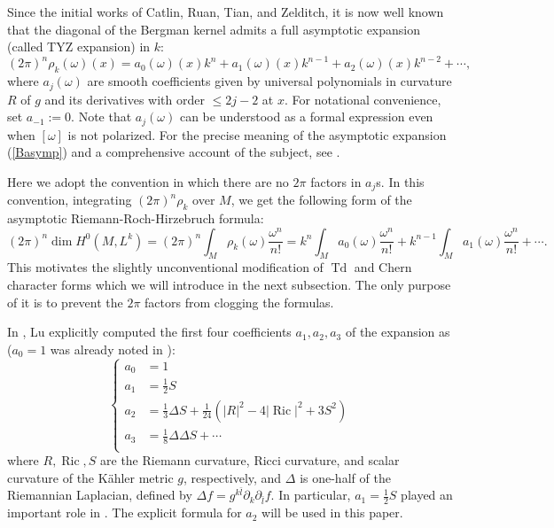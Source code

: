 \documentclass[12pt,reqno,a4paper]{amsart}
\numberwithin{equation}{section}
\def\bl{\bar l}
\def\p{\partial}
\DeclareMathOperator{\Td}{Td}
\DeclareMathOperator{\ric}{Ric}
\theoremstyle{remark}
\theoremstyle{dotless}
\begin{document}
Since the initial works of Catlin, Ruan, Tian, and Zelditch, it is now well known that the diagonal of the Bergman kernel admits a full asymptotic expansion (called TYZ expansion) in $k$:
\begin{equation}\label{Basymp}
(2\pi)^n\rho_k(\omega)(x)=a_0(\omega)(x)k^n+a_1(\omega)(x)k^{n-1}+a_2(\omega)(x)k^{n-2}+\cdots,
\end{equation}
where $a_j(\omega)$ are smooth coefficients given by universal polynomials in curvature $R$ of $g$ and its derivatives with order $\leq 2j-2$ at $x$. For notational convenience, set $a_{-1}:=0$. Note that $a_j(\omega)$ can be understood as a formal expression even when $[\omega]$ is not polarized. For the precise meaning of the asymptotic expansion (\ref{Basymp}) and a comprehensive account of the subject, see \cite{ma2007holomorphic}.

Here we adopt the convention in which there are no $2\pi$ factors in $a_j$s. In this convention, integrating $(2\pi)^n\rho_k$ over $M$, we get the following form of the asymptotic Riemann-Roch-Hirzebruch formula:
\begin{equation}\label{aRR}
(2\pi)^n\dim H^0(M,L^k)=(2\pi)^n\int_M \rho_k(\omega)\frac{\omega^n}{n!}  = k^n\int_M a_0(\omega)\frac{\omega^n}{n!}+k^{n-1}\int_M a_1(\omega) \frac{\omega^n}{n!} + \cdots.
\end{equation}
This motivates the slightly unconventional modification of $\Td$ and Chern character forms which we will introduce in the next subsection. The only purpose of it is to prevent the $2\pi$ factors from clogging the formulas.

In \cite{lu2000lower}, Lu explicitly computed the first four coefficients $a_1, a_2, a_3$ of the expansion as ($a_0=1$ was already noted in \cite{zelditch1998szego}):
\begin{equation}\label{lower}
\left\{ \begin{aligned} 
  a_0 &= 1\\
  a_1 &= \frac12 S\\
  a_2 &= \frac13 \Delta S + \frac{1}{24}(|R|^2-4|\ric|^2+3S^2)\\
  a_3 &= \frac18\Delta\Delta S + \cdots\\
\end{aligned} \right.
\end{equation}
where $R, \ric, S$ are the Riemann curvature, Ricci curvature, and scalar curvature of the K\"ahler metric $g$, respectively, and $\Delta$ is one-half of the Riemannian Laplacian, defined by $\Delta f=g^{k\bl} \p_k \p_{\bl} f$. In particular, $a_1=\frac12 S$ played an important role in \cite{donaldson2001scalar}. The explicit formula for $a_2$ will be used in this paper.
\end{document}
